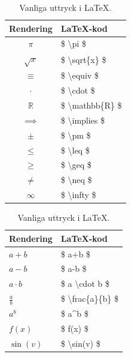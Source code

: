 \documentclass[titlepage]{article}
\begin{document}
\begin{table}
\begin{minipage}[b]{.5\linewidth}
    \begin{center}
    \begin{tabular}{| c | l |}
        \hline 
        \textbf{Rendering} & \textbf{\LaTeX-kod} \\
        \hline
        $\pi$ & \$ \textbackslash pi \$ \\
        \hline
        $\sqrt{ x }$ & \$ \textbackslash sqrt\{x\} \$ \\
        \hline
        $\equiv$ & \$ \textbackslash equiv \$ \\
        \hline
        $\cdot$ & \$ \textbackslash cdot \$ \\
        \hline
        $\mathbb{R}$ & \$ \textbackslash mathbb\{R\} \$ \\
        \hline
        $\implies$ & \$ \textbackslash implies \$ \\
        \hline
        $\pm$ & \$ \textbackslash pm \$ \\
        \hline
        $\leq$ & \$ \textbackslash leq \$ \\
        \hline
        $\geq$ & \$ \textbackslash geq \$ \\
        \hline
        $\neq$ & \$ \textbackslash neq \$ \\
        \hline
        $\infty$ & \$ \textbackslash infty \$ \\
        \hline
    \end{tabular}
    \caption{Vanliga symboler i \LaTeX.}
    \label{t1}
    \end{center}
\end{minipage}
\begin{minipage}[b]{.5\linewidth}
    \begin{center}
        \begin{tabular}{| l | l |}
            \hline
            \textbf{Rendering} & \textbf{\LaTeX-kod} \\
            \hline
            $a+b$ & \$ a+b \$ \\
            \hline
            $a-b$ & \$ a-b \$ \\
            \hline
            $a \cdot b$ & \$ a \textbackslash cdot b \$ \\
            \hline
            $\frac{a}{b}$ & \$ \textbackslash frac\{a\}\{b\} \$ \\
            \hline
            $a^b$ & \$ a\textasciicircum b \$ \\
            \hline
            $f(x)$ & \$ f(x) \$ \\
            \hline
            $\sin(v)$ & \$ \textbackslash sin(v) \$ \\
            \hline
        \end{tabular}
        \caption{Vanliga uttryck i \LaTeX.}
        \label{t2}
    \end{center}
\end{minipage}
\end{table}
\end{document}
